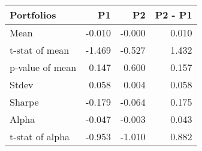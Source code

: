 \begin{tabular}{lrrr}
\toprule
Portfolios & P1 & P2 & P2 - P1 \\
\midrule
Mean & -0.010 & -0.000 & 0.010 \\
t-stat of mean & -1.469 & -0.527 & 1.432 \\
p-value of mean & 0.147 & 0.600 & 0.157 \\
Stdev & 0.058 & 0.004 & 0.058 \\
Sharpe & -0.179 & -0.064 & 0.175 \\
Alpha & -0.047 & -0.003 & 0.043 \\
t-stat of alpha & -0.953 & -1.010 & 0.882 \\
\bottomrule
\end{tabular}
